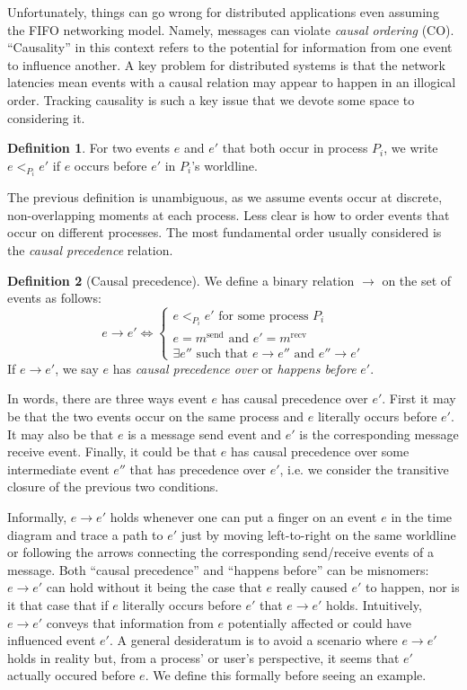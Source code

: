 \documentclass[]             %
{NASA}                       %
\theoremstyle{definition}
\newtheorem{definition}{Definition}[section]
\begin{document}
Unfortunately, things can go wrong for distributed applications even
assuming the FIFO networking model. Namely, messages can violate
\emph{causal ordering} (CO). ``Causality'' in this context refers to
the potential for information from one event to influence another. A
key problem for distributed systems is that the network latencies mean
events with a causal relation may appear to happen in an illogical
order. Tracking causality is such a key issue that we devote some
space to considering it.

\begin{definition}
  For two events $e$ and $e'$ that both occur in process $P_i$, we
  write $e <_{P_i} e'$ if $e$ occurs before $e'$ in $P_i$'s
  worldline.
\end{definition}
The previous definition is unambiguous, as we assume events occur at
discrete, non-overlapping moments at each process. Less clear is how
to order events that occur on different processes. The most
fundamental order usually considered is the \emph{causal precedence}
relation.

\begin{definition}[Causal precedence]
  We define a binary relation $\to$ on the set of events as follows:
  \[e \to e' \iff \begin{cases} e <_{P_i} e' \textrm{ for some process $P_i$} \\
    e = m^\textrm{send} \textrm{ and } e' = m^\textrm{recv} \\ \exists
    e'' \textrm{ such that } e \to e'' \textrm{ and } e'' \to e'
  \end{cases}
  \]
  If $e \to e'$, we say $e$ has \emph{causal precedence over} or
  \emph{happens before} $e'$.
\end{definition}
In words, there are three ways event $e$ has causal precedence over
$e'$.  First it may be that the two events occur on the same process
and $e$ literally occurs before $e'$. It may also be that $e$ is a
message send event and $e'$ is the corresponding message receive
event. Finally, it could be that $e$ has causal precedence over some
intermediate event $e''$ that has precedence over $e'$, i.e. we
consider the transitive closure of the previous two conditions.

Informally, $e \to e'$ holds whenever one can put a finger on an event
$e$ in the time diagram and trace a path to $e'$ just by moving
left-to-right on the same worldline or following the arrows connecting
the corresponding send/receive events of a message. Both ``causal
precedence'' and ``happens before'' can be misnomers: $e \to e'$ can
hold without it being the case that $e$ really caused $e'$ to happen,
nor is it that case that if $e$ literally occurs before $e'$ that $e
\to e'$ holds. Intuitively, $e \to e'$ conveys that information from
$e$ potentially affected or could have influenced event $e'$. A
general desideratum is to avoid a scenario where $e \to e'$ holds in
reality but, from a process' or user's perspective, it seems that $e'$
actually occured before $e$. We define this formally before seeing an
example.
\end{document}
